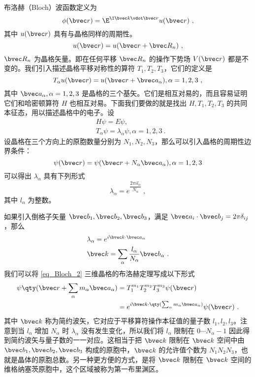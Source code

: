 \cite{黄昆}\cite{Bransden}布洛赫（Bloch）波函数定义为
\begin{equation}\label{eq_Bloch_3}
\phi(\bvec r) = \E^{\I \bvec k \vdot \bvec r} u(\bvec r)~,
\end{equation}
其中 $u(\bvec r)$ 具有与晶格同样的周期性。
\begin{equation}
u(\bvec r)=u(\bvec r+\bvec R_n)~,
\end{equation}
$\bvec R_n$ 为晶格矢量。即在任何平移 $\bvec R_n$ 的操作下势场 $V(\bvec r)$ 都是不变的。我们引入描述晶格平移对称性的算符 $T_1,T_2,T_3$，它们的定义是
\begin{equation}
T_\alpha u(\bvec r)= u(\bvec r+\bvec a_\alpha),\alpha=1,2,3~,
\end{equation}
其中 $\bvec a_\alpha,\alpha=1,2,3$ 是晶格的三个基矢。它们是相互对易的，而且容易证明它们和哈密顿算符 $H$ 也相互对易。下面我们要做的就是找出 $H,T_1,T_2,T_3$ 的共同本征态，用以描述晶格中的电子。设
\begin{equation}
\begin{aligned}
&H\psi=E\psi,\\
&T_\alpha \psi = \lambda_\alpha \psi, \alpha=1,2,3~.
\end{aligned}
\end{equation}
设晶格在三个方向上的原胞数量分别为 $N_1,N_2,N_3$，那么可以引入晶格的周期性边界条件：
\begin{equation}
\psi(\bvec r)=\psi(\bvec r+N_\alpha \bvec a_\alpha),\alpha=1,2,3
\end{equation}
可以得出 $\lambda_\alpha$ 具有下列形式
\begin{equation}
\lambda_\alpha=e^{ \dfrac{2\pi i l_\alpha}{N_\alpha}}~,
\end{equation}
其中 $l_\alpha$ 为整数。

如果引入倒格子矢量 $\bvec b_1,\bvec b_2,\bvec b_3$，满足 $\bvec a_i \cdot \bvec b_j = 2\pi \delta_{ij}$，那么
\begin{equation}
\begin{aligned}
&\lambda_\alpha = e^{i \bvec k \cdot \bvec a_\alpha}\\
&\bvec k=\sum_\alpha\frac{l_\alpha}{N_\alpha} \bvec b_\alpha~.
\end{aligned}
\end{equation}
我们可以将 \autoref{eq_Bloch_2} 三维晶格的布洛赫定理写成以下形式
\begin{equation}
\begin{aligned}
\psi\qty(\bvec r+\sum_\alpha m_\alpha\bvec a_\alpha) &= T_1^{m_1} T_2^{m_2} T_3^{m_3} \psi(\bvec r)\\
&=e^{i\bvec k\cdot \qty(\sum_\alpha m_\alpha\bvec a_\alpha)}\psi(\bvec r)~.
\end{aligned}
\end{equation}
其中 $\bvec k$ 称为简约波矢，它对应于平移算符操作本征值的量子数 $l_1,l_2,l_3$。注意到当 $l_\alpha$ 增加 $N_\alpha$ 时 $\lambda_\alpha$ 没有发生变化，所以我们将 $l_\alpha$ 限制在 $0\cdots N_\alpha-1$ 因此得到简约波矢与量子数的一一对应。这相当于把 $\bvec k$ 限制在 $\bvec k$ 空间中由 $\bvec b_1,\bvec b_2,\bvec b_3$ 构成的原胞中，$\bvec k$ 的允许值个数为 $N_1N_2N_3$，也就是晶体的原胞总数。另一种更方便的方式，是将 $\bvec k$ 限制在 $\bvec k$ 空间的维格纳塞茨原胞中，这个区域被称为第一布里渊区。